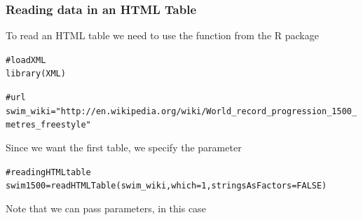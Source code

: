 \documentclass{beamer}\usepackage[]{graphicx}\usepackage[]{color}
\makeatletter
\newcommand{\hlnum}[1]{\textcolor[rgb]{0.063,0.58,0.627}{#1}}%
\newcommand{\hlstr}[1]{\textcolor[rgb]{0.063,0.58,0.627}{#1}}%
\newcommand{\hlcom}[1]{\textcolor[rgb]{0.588,0.588,0.588}{#1}}%
\newcommand{\hlstd}[1]{\textcolor[rgb]{0.196,0.196,0.196}{#1}}%
\newcommand{\hlkwb}[1]{\textcolor[rgb]{0.627,0,0.314}{#1}}%
\newcommand{\hlkwc}[1]{\textcolor[rgb]{0,0.631,0.314}{#1}}%
\newcommand{\hlkwd}[1]{\textcolor[rgb]{0.78,0.227,0.412}{#1}}%
\newenvironment{kframe}{%
 \def\at@end@of@kframe{}%
 \ifinner\ifhmode%
  \def\at@end@of@kframe{\end{minipage}}%
  \begin{minipage}{\columnwidth}%
 \fi\fi%
 \def\FrameCommand##1{\hskip\@totalleftmargin \hskip-\fboxsep
 \colorbox{shadecolor}{##1}\hskip-\fboxsep
     \hskip-\linewidth \hskip-\@totalleftmargin \hskip\columnwidth}%
 \MakeFramed {\advance\hsize-\width
   \@totalleftmargin\z@ \linewidth\hsize
   \@setminipage}}%
 {\par\unskip\endMakeFramed%
 \at@end@of@kframe}
\newenvironment{knitrout}{}{} %
\makeatother
\begin{document}
\begin{frame}[fragile]
\frametitle{Reading data in an HTML Table}

To read an HTML table we need to use the function  from the R package 

\begin{knitrout}\tiny
{}\color{fgcolor}\begin{kframe}
\begin{alltt}
\hlcom{# load XML}
\hlkwd{library}\hlstd{(XML)}

\hlcom{# url}
\hlstd{swim_wiki} \hlkwb{=} \hlstr{"http://en.wikipedia.org/wiki/World_record_progression_1500_metres_freestyle"}
\end{alltt}
\end{kframe}
\end{knitrout}

\vspace{3mm}
Since we want the first table, we specify the parameter  
\begin{knitrout}\tiny
{}\color{fgcolor}\begin{kframe}
\begin{alltt}
\hlcom{# reading HTML table}
\hlstd{swim1500} \hlkwb{=} \hlkwd{readHTMLTable}\hlstd{(swim_wiki,} \hlkwc{which} \hlstd{=} \hlnum{1}\hlstd{,} \hlkwc{stringsAsFactors} \hlstd{=} \hlnum{FALSE}\hlstd{)}
\end{alltt}
\end{kframe}
\end{knitrout}

Note that we can pass  parameters, in this case 
\end{frame}

\end{document}
